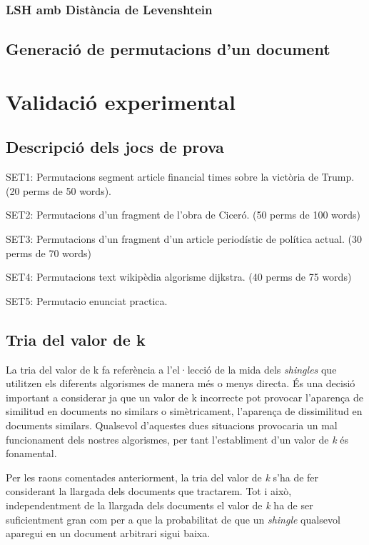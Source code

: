 \documentclass[catalan, 12pt]{report}
\begin{document}
\subsection{LSH amb Distància de Levenshtein}

\section{Generació de permutacions d'un document}

\chapter{Validació experimental}
\section{Descripció dels jocs de prova}

SET1: Permutacions segment article financial times sobre la victòria de Trump. (20 perms de 50 words). \newline

SET2: Permutacions d'un fragment de l'obra de Ciceró. (50 perms de 100 words) \newline

SET3: Permutacions d'un fragment d'un article periodístic de política actual. (30 perms de 70 words)\newline

SET4: Permutacions text wikipèdia algorisme dijkstra. (40 perms de 75 words)

SET5: Permutacio enunciat practica.

\section{Tria del valor de k}

La tria del valor de k fa referència a l'el·lecció de la mida dels \textit{shingles} que utilitzen els diferents algorismes de manera més o menys directa. És una decisió important a considerar ja que un valor de k incorrecte pot provocar l'aparença de similitud en documents no similars o simètricament, l'aparença de dissimilitud en documents similars. Qualsevol d'aquestes dues situacions provocaria un mal funcionament dels nostres algorismes, per tant l'establiment d'un valor de \textit{k} és fonamental. \newline

Per les raons comentades anteriorment, la tria del valor de \textit{k} s'ha de fer considerant la llargada dels documents que tractarem. Tot i això, independentment de la llargada dels documents el valor de \textit{k} ha de ser suficientment gran com per a que la probabilitat de que un \textit{shingle} qualsevol aparegui en un document arbitrari sigui baixa. \newline
\end{document}
